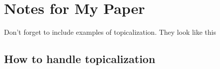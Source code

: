 \documentclass[12pt]{article}
\begin{document}
\section*{Notes for My Paper}

Don't forget to include examples of topicalization.
They look like this

\subsection*{How to handle topicalization}
\end{document}
